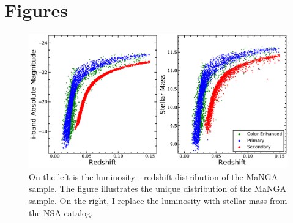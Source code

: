 \documentclass[iop,revtex4,twocolumn,apj,numberedappendix,appendixfloats]{emulateapj}
\begin{document}




\hbox{}\clearpage

\appendix

\section{Figures}

\begin{figure}
\centering
\includegraphics[width=\linewidth]{fig/Mi-z.pdf}
\caption[The luminosity - redshift distribution and mass - redshift distribution of the MaNGA sample.]{On the left is the luminosity - redshift distribution of the MaNGA sample. The figure illustrates the unique distribution of the MaNGA sample. On the right, I replace the luminosity with stellar mass from the NSA catalog.}
\label{fig:Mi_z}
\end{figure}
\end{document}
